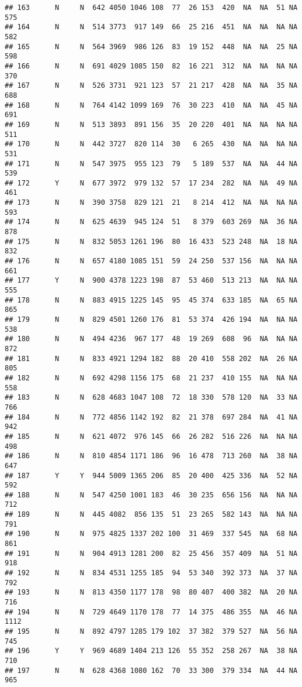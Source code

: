 \documentclass[]{article}
\begin{document}
\begin{verbatim}
## 163      N     N  642 4050 1046 108  77  26 153  420  NA  NA  51 NA  575
## 164      N     N  514 3773  917 149  66  25 216  451  NA  NA  NA NA  582
## 165      N     N  564 3969  986 126  83  19 152  448  NA  NA  25 NA  598
## 166      N     N  691 4029 1085 150  82  16 221  312  NA  NA  NA NA  370
## 167      N     N  526 3731  921 123  57  21 217  428  NA  NA  35 NA  688
## 168      N     N  764 4142 1099 169  76  30 223  410  NA  NA  45 NA  691
## 169      N     N  513 3893  891 156  35  20 220  401  NA  NA  NA NA  511
## 170      N     N  442 3727  820 114  30   6 265  430  NA  NA  NA NA  531
## 171      N     N  547 3975  955 123  79   5 189  537  NA  NA  44 NA  539
## 172      Y     N  677 3972  979 132  57  17 234  282  NA  NA  49 NA  461
## 173      N     N  390 3758  829 121  21   8 214  412  NA  NA  NA NA  593
## 174      N     N  625 4639  945 124  51   8 379  603 269  NA  36 NA  878
## 175      N     N  832 5053 1261 196  80  16 433  523 248  NA  18 NA  832
## 176      N     N  657 4180 1085 151  59  24 250  537 156  NA  NA NA  661
## 177      Y     N  900 4378 1223 198  87  53 460  513 213  NA  NA NA  555
## 178      N     N  883 4915 1225 145  95  45 374  633 185  NA  65 NA  865
## 179      N     N  829 4501 1260 176  81  53 374  426 194  NA  NA NA  538
## 180      N     N  494 4236  967 177  48  19 269  608  96  NA  NA NA  872
## 181      N     N  833 4921 1294 182  88  20 410  558 202  NA  26 NA  805
## 182      N     N  692 4298 1156 175  68  21 237  410 155  NA  NA NA  558
## 183      N     N  628 4683 1047 108  72  18 330  578 120  NA  33 NA  766
## 184      N     N  772 4856 1142 192  82  21 378  697 284  NA  41 NA  942
## 185      N     N  621 4072  976 145  66  26 282  516 226  NA  NA NA  498
## 186      N     N  810 4854 1171 186  96  16 478  713 260  NA  38 NA  647
## 187      Y     Y  944 5009 1365 206  85  20 400  425 336  NA  52 NA  592
## 188      N     N  547 4250 1001 183  46  30 235  656 156  NA  NA NA  712
## 189      N     N  445 4082  856 135  51  23 265  582 143  NA  NA NA  791
## 190      N     N  975 4825 1337 202 100  31 469  337 545  NA  68 NA  861
## 191      N     N  904 4913 1281 200  82  25 456  357 409  NA  51 NA  918
## 192      N     N  834 4531 1255 185  94  53 340  392 373  NA  37 NA  792
## 193      N     N  813 4350 1177 178  98  80 407  400 382  NA  20 NA  716
## 194      N     N  729 4649 1170 178  77  14 375  486 355  NA  46 NA 1112
## 195      N     N  892 4797 1285 179 102  37 382  379 527  NA  56 NA  745
## 196      Y     Y  969 4689 1404 213 126  55 352  258 267  NA  38 NA  710
## 197      N     N  628 4368 1080 162  70  33 300  379 334  NA  44 NA  965

\end{verbatim}
\end{document}
